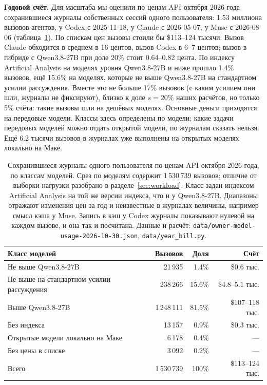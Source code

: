 \textbf{Годовой счёт.} Для масштаба мы оценили по ценам API октября 2026 года сохранившиеся журналы
собственных сессий одного пользователя: 1.53 миллиона вызовов агентов, у Codex с 2025-11-18, у Claude с 2026-05-07,
у Muse с 2026-08-06 (таблица~\ref{tab:owner}). По спискам цен вызовы стоили бы \$113--124 тысячи. Вызов Claude обходится
в среднем в 16 центов, вызов Codex в 6--7 центов; вызов в гибриде с Qwen3.8-27B при доле 20\% стоит 0.64--0.82 цента. По индексу
Artificial Analysis на моделях уровня Qwen3.8-27B и ниже прошло 1.4\% вызовов, ещё 15.6\% на моделях, которые не
выше Qwen3.8-27B на стандартном усилии рассуждения. Вместе это не больше 17\% вызовов (с каким усилием они шли, журналы не
фиксируют), близко к доле $s = 20\%$ наших расчётов, но только 5\% счёта: такие вызовы шли на дешёвых моделях. Основные деньги приходятся на передовые модели.
Классы здесь определены по модели; какие задачи передовых моделей можно отдать открытой модели, по журналам сказать
нельзя. Ещё 6.2 тысячи вызовов в журналах уже выполнены на открытых моделях локально на Маке.

\begin{table}[t]
\centering
\caption{Сохранившиеся журналы одного пользователя по ценам API октября 2026 года, по классам моделей.
Срез по моделям содержит 1\,530\,739 вызовов; отличие от выборки нагрузки разобрано в разделе~\ref{sec:workload}. Класс задан
индексом Artificial Analysis на той же версии индекса, что и у Qwen3.8-27B. Диапазоны отражают изменения цен за год
и неизвестные в журналах величины, например смысл кэша у Muse. Запись в кэш у Codex журналы показывают нулевой на
каждом вызове, и она так и посчитана. Данные и расчёт: \texttt{data/owner-model-usage-2026-10-30.json},
\texttt{data/year\_bill.py}.}
\label{tab:owner}
\footnotesize
\begin{tabular}{lrrr}
\toprule
Класс моделей & Вызовов & Доля & Счёт \\
\midrule
Не выше Qwen3.8-27B & 21\,935 & 1.4\% & \$0.6 тыс. \\
Не выше на стандартном усилии рассуждения & 238\,266 & 15.6\% & \$4.8--5.1 тыс. \\
Выше Qwen3.8-27B & 1\,248\,111 & 81.5\% & \$107--118 тыс. \\
Без индекса & 13\,157 & 0.9\% & \$0.3 тыс. \\
Открытые модели локально на Маке & 6\,178 & 0.4\% & --- \\
Без цены в списке & 3\,092 & 0.2\% & --- \\
\midrule
Всего & 1\,530\,739 & 100\% & \$113--124 тыс. \\
\bottomrule
\end{tabular}
\end{table}

